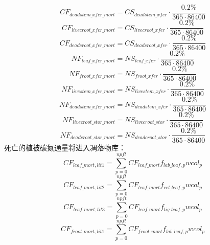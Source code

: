 \begin{equation}
  CF_{deadstem\_{{xfer}\_{mort}}}=CS_{deadstem\_{xfer}}\cdot \frac{0.2\%}{365\cdot 86400}
\end{equation}
\begin{equation}
  CF_{livecroot\_{{xfer}\_{mort}}}=CS_{livecroot\_{xfer}}\cdot \frac{0.2\%}{365\cdot 86400}
\end{equation}
\begin{equation}
  CF_{deadcroot\_{{xfer}\_{mort}}}=CS_{deadcroot\_{xfer}}\cdot \frac{0.2\%}{365\cdot 86400}
\end{equation}
\begin{equation}
  NF_{leaf\_{{xfer}\_{mort}}}=NS_{leaf\_{xfer}}\cdot \frac{0.2\%}{365\cdot 86400}
\end{equation}
\begin{equation}
  NF_{froot\_{{xfer}\_{mort}}}=NS_{froot\_{xfer}}\cdot \frac{0.2\%}{365\cdot 86400}
\end{equation}
\begin{equation}
  NF_{livestem\_{{xfer}\_{mort}}}=NS_{livestem\_{xfer}}\cdot \frac{0.2\%}{365\cdot 86400}
\end{equation}
\begin{equation}
  NF_{deadstem\_{{xfer}\_{mort}}}=NS_{deadstem\_{xfer}}\cdot \frac{0.2\%}{365\cdot 86400}
\end{equation}
\begin{equation}
  NF_{livecroot\_{{stor}\_{mort}}}=NS_{livecroot\_{stor}}\cdot \frac{0.2\%}{365\cdot 86400}
\end{equation}
\begin{equation}
  NF_{deadcroot\_{{stor}\_{mort}}}=NS_{deadcroot\_{stor}}\cdot \frac{0.2\%}{365\cdot 86400}
\end{equation}
死亡的植被碳氮通量将进入凋落物库：
\begin{equation}
CF_{leaf\_{mort},lit1}=\sum_{p=0}^{npft}{CF_{leaf\_{mort}}f_{lab\_{leaf},p}{wcol_p}}
\end{equation}
\begin{equation}
CF_{leaf\_{mort},lit2}=\sum_{p=0}^{npft}{CF_{leaf\_{mort}}f_{cel\_{leaf},p}{wcol_p}}
\end{equation}
\begin{equation}
CF_{leaf\_{mort},lit3}=\sum_{p=0}^{npft}{CF_{leaf\_{mort}}f_{lig\_{leaf},p}{wcol_p}}
\end{equation}
\begin{equation}
CF_{froot\_mort,lit1}=\sum_{p=0}^{npft}{CF_{froot\_mort}f_{lab\_{leaf},p}{wcol_p}}
\end{equation}
